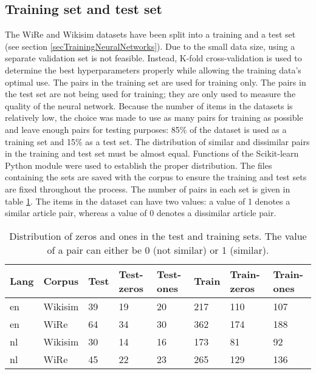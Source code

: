 {\subsection{Training set and test set}
The WiRe and Wikisim datasets have been split into a training and a test set (see section \ref{secTrainingNeuralNetworks}). Due to the small data size, using a separate validation set is not feasible. Instead, K-fold cross-validation is used to determine the best hyperparameters properly while allowing the training data's optimal use. The pairs in the training set are used for training only. The pairs in the test set are not being used for training; they are only used to measure the quality of the neural network. Because the number of items in the datasets is relatively low, the choice was made to use as many pairs for training as possible and leave enough pairs for testing purposes: 85\% of the dataset is used as a training set and 15\% as a test set. The distribution of similar and dissimilar pairs in the training and test set must be almost equal. Functions of the Scikit-learn Python module were used to establish the proper distribution. The files containing the sets are saved with the corpus to ensure the training and test sets are fixed throughout the process. The number of pairs in each set is given in table \ref{tabTestDistr}. The items in the dataset can have two values: a value of 1 denotes a similar article pair, whereas a value of 0 denotes a dissimilar article pair. 

\begin{table}[!ht]
    \centering
    \captionsetup{justification=centering}
    \begin{tabular}{l|l|l|l|l|l|l|l}
    \hline
        \textbf{Lang} & \textbf{Corpus} &  \textbf{Test} & \textbf{Test-zeros} & \textbf{Test-ones} & \textbf{Train} & \textbf{Train-zeros} & \textbf{Train-ones} \\ \hline
en & Wikisim & 39 & 19 & 20 & 217 & 110 & 107  \\ \hline
en & WiRe & 64 & 34 & 30 & 362 & 174 & 188 \\ \hline
nl & Wikisim & 30 & 14 & 16 & 173 & 81 & 92 \\ \hline
nl & WiRe & 45 & 22 & 23 & 265 & 129 & 136 \\ \hline

\end{tabular}
    \caption{Distribution of zeros and ones in the test and training sets. The value of a pair can either be 0 (not similar) or 1 (similar).}
    \label{tabTestDistr}
\end{table}

}
